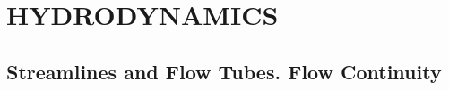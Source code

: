 

\chapter{HYDRODYNAMICS}\label{chap:9}

\section{Streamlines and Flow Tubes. Flow Continuity}\label{sec:9_1}

